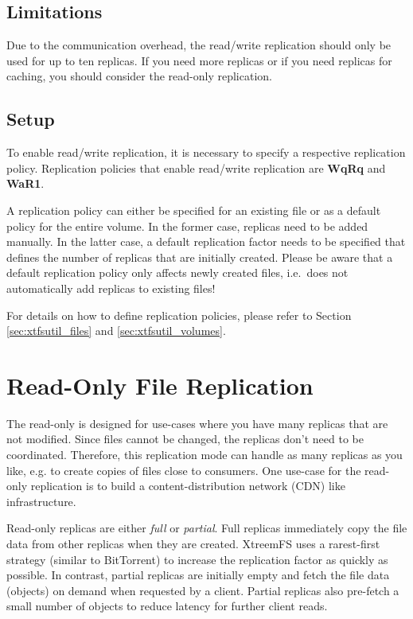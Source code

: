 \documentclass[a4paper,10pt]{book}
\begin{document}
\subsection{Limitations}
Due to the communication overhead, the read/write replication should only be used for up to ten replicas. If you need more replicas or if you need replicas for caching, you should consider the read-only replication.

\subsection{Setup}
To enable read/write replication, it is necessary to specify a respective replication policy. Replication policies that enable read/write replication are \textbf{WqRq} and \textbf{WaR1}.

A replication policy can either be specified for an existing file or as a default policy for the entire volume. In the former case, replicas need to be added manually. In the latter case, a default replication factor needs to be specified that defines the number of replicas that are initially created. Please be aware that a default replication policy only affects newly created files, i.e.\ does not automatically add replicas to existing files!

For details on how to define replication policies, please refer to Section \ref{sec:xtfsutil_files} and \ref{sec:xtfsutil_volumes}.

\section{Read-Only File Replication}
\label{sec:ronly_replication}
The read-only is designed for use-cases where you have many replicas that are not modified. Since files cannot be changed, the replicas don't need to be coordinated. Therefore, this replication mode can handle as many replicas as you like, e.g. to create copies of files close to consumers. One use-case for the read-only replication is to build a content-distribution network (CDN) like infrastructure.

Read-only replicas are either \textit{full} or \textit{partial}. Full replicas immediately copy the file data from other replicas when they are created. XtreemFS uses a rarest-first strategy (similar to BitTorrent) to increase the replication factor as quickly as possible. In contrast, partial replicas are initially empty and fetch the file data (objects) on demand when requested by a client. Partial replicas also pre-fetch a small number of objects to reduce latency for further client reads.
\end{document}
